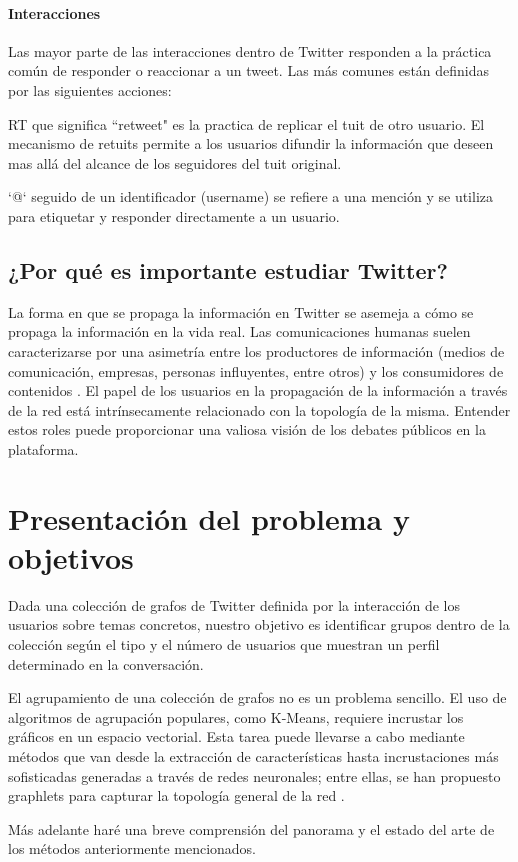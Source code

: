 \paragraph{Interacciones}

Las mayor parte de las interacciones dentro de Twitter responden a la práctica común de responder o reaccionar a un tweet. \cite{kwak_what_2010} Las más comunes están definidas por las siguientes acciones: 

RT que significa “retweet" es la practica de replicar el tuit de otro usuario. El mecanismo de retuits permite a los usuarios difundir la información que deseen mas allá del alcance de los seguidores del tuit original.

 ‘@‘ seguido de un identificador (username) se refiere a una mención y se utiliza para etiquetar y responder directamente a un usuario.


\subsection{¿Por qué es importante estudiar Twitter?}
\label{sec:intro:results:refs:method}
{
La forma en que se propaga la información en Twitter se asemeja a cómo se propaga la información en la vida real. Las comunicaciones humanas suelen caracterizarse por una asimetría entre los productores de información (medios de comunicación, empresas, personas influyentes, entre otros) y los consumidores de contenidos \cite{gabielkov_studying_2014}. El papel de los usuarios en la propagación de la información a través de la red está intrínsecamente relacionado con la topología de la misma. Entender estos roles puede proporcionar una valiosa visión de los debates públicos en la plataforma. 
}


\section{Presentación del problema y objetivos}
\label{sec:intro:motivación}
{
Dada una colección de grafos de Twitter definida por la interacción de los usuarios sobre temas concretos, nuestro objetivo es identificar grupos dentro de la colección según el tipo y el número de usuarios que muestran un perfil determinado en la conversación. 

El agrupamiento de una colección de grafos no es un problema sencillo. El uso de algoritmos de agrupación populares, como K-Means, requiere incrustar los gráficos en un espacio vectorial. Esta tarea puede llevarse a cabo mediante métodos que van desde la extracción de características hasta incrustaciones más sofisticadas generadas a través de redes neuronales; entre ellas, se han propuesto graphlets para capturar la topología general de la red \cite{sarajlic_graphlet-based_2016}.

Más adelante haré una breve comprensión del panorama y el estado del arte de los métodos anteriormente mencionados.
}


